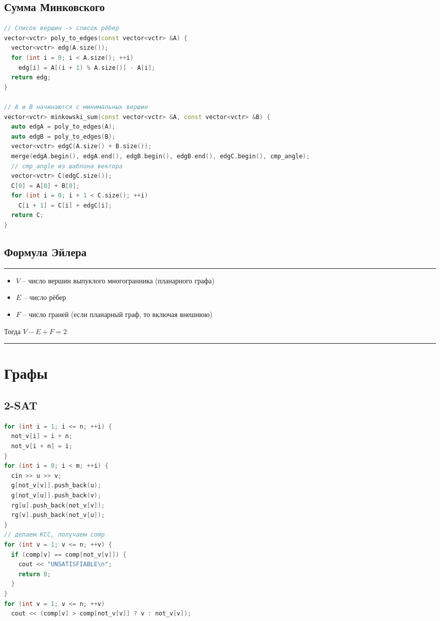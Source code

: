\documentclass[9pt,a4paper,landscape,twosided]{extarticle}
\begin{document}
\begin{multicols*}{3}
\begin{lstlisting}[language=C++]
\end{lstlisting}

\subsection{Сумма Минковского}
\begin{lstlisting}[language=C++]
// Список вершин -> список рёбер
vector<vctr> poly_to_edges(const vector<vctr> &A) {
  vector<vctr> edg(A.size());
  for (int i = 0; i < A.size(); ++i)
    edg[i] = A[(i + 1) % A.size()] - A[i];
  return edg;
}

// A и B начинаются с минимальных вершин
vector<vctr> minkowski_sum(const vector<vctr> &A, const vector<vctr> &B) {
  auto edgA = poly_to_edges(A);
  auto edgB = poly_to_edges(B);
  vector<vctr> edgC(A.size() + B.size());
  merge(edgA.begin(), edgA.end(), edgB.begin(), edgB.end(), edgC.begin(), cmp_angle);
  // cmp_angle из шаблона вектора
  vector<vctr> C(edgC.size());
  C[0] = A[0] + B[0];
  for (int i = 0; i + 1 < C.size(); ++i)
    C[i + 1] = C[i] + edgC[i];
  return C;
}

\end{lstlisting}

\subsection{Формула Эйлера}
\noindent\rule{\linewidth}{0.15mm}
\begin{itemize}
    \item $V$ -- число вершин выпуклого многогранника (планарного графа)
    \item $E$ -- число рёбер
    \item $F$ -- число граней (если планарный граф, то включая внешнюю)
\end{itemize}
Тогда $V-E+F=2$

\noindent\rule{\linewidth}{0.15mm}

\section{Графы}

\subsection{2-SAT}
\begin{lstlisting}[language=C++]
for (int i = 1; i <= n; ++i) {
  not_v[i] = i + n;
  not_v[i + n] = i;
}
for (int i = 0; i < m; ++i) {
  cin >> u >> v;
  g[not_v[v]].push_back(u);
  g[not_v[u]].push_back(v);
  rg[u].push_back(not_v[v]);
  rg[v].push_back(not_v[u]);
}
// делаем КСС, получаем comp
for (int v = 1; v <= n; ++v) {
  if (comp[v] == comp[not_v[v]]) {
    cout << "UNSATISFIABLE\n";
    return 0;
  }
}
for (int v = 1; v <= n; ++v)
  cout << (comp[v] > comp[not_v[v]] ? v : not_v[v]);
\end{lstlisting}


\end{multicols*}
\end{document}
